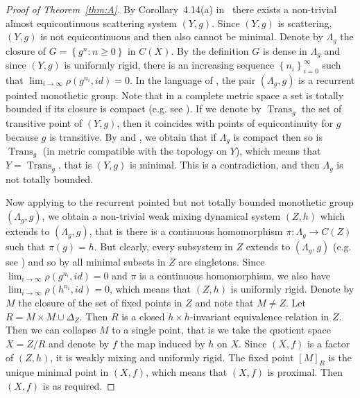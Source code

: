\documentclass[reqno,a4paper,12pt]{amsart}
\theoremstyle{definition}
\numberwithin{equation}{section}
\begin{document}
\begin{proof}[Proof of Theorem~\ref{thm:A}]
By Corollary~4.14(a) in~\cite{AG} there exists a non-trivial almost equicontinuous scattering system $(Y,g)$.
Since $(Y,g)$ is scattering, $(Y,g)$ is not equicontinuous and then also cannot be minimal.
Denote by $\Lambda_g$ the closure of $G={\left\{{g^n : n\geq 0}\right\}}$ in $C(X)$.
By the definition $G$ is dense in $\Lambda_g$ and since $(Y,g)$
is uniformly rigid, there is an increasing sequence ${\left\{{n_i}\right\}}_{i=0}^\infty$ such that $\lim_{i\to \infty}\rho(g^{n_i},id)=0$.
In the language of \cite{AG}, the pair $(\Lambda_g,g)$ is a recurrent pointed monothetic group.
Note that in a complete metric space a set is totally bounded if its closure is compact (e.g. see \cite[Corollary~XIV.3.6]{Dug}).
If we denote by $\operatorname{Trans}_g$ the set of transitive point of $(Y,g)$,
then it coincides with points of equicontinuity for $g$ because $g$ is transitive.
By \cite[Theorem~4.2(5)]{AG} and \cite[Theorem~4.3]{AG}, we obtain that if $\Lambda_g$ is compact then so is $\operatorname{Trans}_g$
(in metric compatible with the topology on $Y$), which means that $Y=\operatorname{Trans}_g$, that is $(Y,g)$ is minimal.
This is a contradiction, and then $\Lambda_g$ is not totally bounded.

Now applying \cite[Corollary~4.19]{AG} to the recurrent pointed but not totally bounded monothetic group $(\Lambda_g,g)$,
we obtain a non-trivial weak mixing dynamical system $(Z,h)$ which extends to $(\Lambda_g,g)$,
that is there is a continuous homomorphism $\pi \colon \Lambda_g \to C(Z)$ such that $\pi(g)=h$.
But clearly, every subsystem in $Z$ extends to $(\Lambda_g,g)$ (e.g. see \cite[Lemma~4.4]{AG})
and
so by \cite[Corollary~4.14(a)(2)]{AG} all minimal subsets in $Z$ are singletons.
Since $\lim_{i\to \infty}\rho(g^{n_i},id)=0$ and $\pi$ is a continuous homomorphism,
we also have $\lim_{i\to \infty}\rho(h^{n_i},id)=0$, which means that $(Z,h)$ is uniformly rigid.
Denote by $M$ the closure of the set of fixed points in $Z$ and note that $M\neq Z$.
Let $R=M\times M \cup \Delta_Z$.  Then $R$ is a closed $h\times h$-invariant  equivalence relation in $Z$.
Then we can collapse $M$ to a single point, that is we take the quotient space
$X=Z/R$ and denote by $f$ the map induced by $h$ on $X$.
Since $(X,f)$ is a factor of $(Z,h)$, it is weakly mixing and uniformly rigid.
The fixed point $[M]_R$ is the unique minimal point in $(X,f)$, which means that $(X,f)$ is proximal.
Then $(X,f)$ is as required.
\end{proof}
\end{document}
